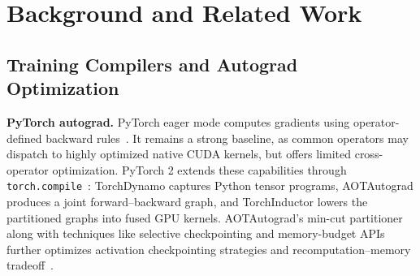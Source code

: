 \section{Background and Related Work}
\label{sec:related}
\subsection{Training Compilers and Autograd Optimization}

\noindent\textbf{PyTorch autograd.}
PyTorch eager mode computes gradients using operator-defined backward rules~\cite{paszke2019pytorch}. It remains a strong baseline, as common operators may dispatch to highly optimized native CUDA kernels, but offers limited cross-operator optimization. PyTorch 2 extends these capabilities through \texttt{torch.compile}~\cite{ansel2024pytorch2}: TorchDynamo captures Python tensor programs, AOTAutograd produces a joint forward--backward graph, and TorchInductor lowers the partitioned graphs into fused GPU kernels. AOTAutograd's min-cut partitioner along with techniques like selective checkpointing and memory-budget APIs further optimizes activation checkpointing strategies and recomputation--memory tradeoff~\cite{chen2016sublinear,pytorch2025activationcheckpointing}.


